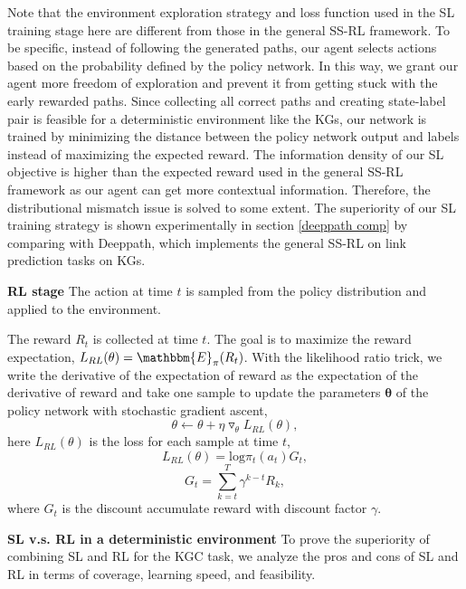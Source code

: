 \documentclass[lettersize,journal]{IEEEtran}
\begin{document}
Note that the environment exploration strategy and loss function used in the SL training stage here are different from those in the general SS-RL framework. To be specific, instead of following the generated paths, our agent selects actions based on the probability defined by the
policy network. In this way, we grant our agent more
freedom of exploration and prevent it from getting
stuck with the early rewarded paths. Since collecting all correct paths and creating state-label pair is feasible for a deterministic environment like the KGs, our network is trained by minimizing
the distance between the policy network output and labels
instead of maximizing the expected reward. The information density
of our SL objective is higher than the expected reward used in the general SS-RL framework as our agent can get more
contextual information. Therefore, the distributional mismatch
issue is solved to some extent. The superiority of our SL training strategy is shown experimentally in section \ref{deeppath comp} by comparing with Deeppath, which implements the general SS-RL on link prediction tasks on KGs.


\textbf{RL stage} The action at time $t$ is sampled from the policy distribution and applied to the environment. 

The reward $R_t$ is collected at time $t$. The goal is to maximize the reward expectation, $L_{RL}(\theta)=\mathbbm{E}_{\pi}(R_t)$.
With the likelihood ratio trick, we write the derivative of the expectation of reward as the expectation of the derivative of reward and take one sample to update the parameters $\mathbf{\theta}$ of the policy network with stochastic gradient ascent,
\begin{equation}
    \theta \leftarrow  \theta     + \eta \triangledown_{\theta} L_{RL}(\theta),
\end{equation}
here $L_{RL}(\theta)$ is the loss for each sample at time $t$,
\begin{equation}
    L_{RL}(\theta)= \mathrm{log}\pi_{t}(a_t)G_t,
\end{equation}
\begin{equation}
    G_t=\sum_{k=t}^{T}\gamma ^{k-t}R_k,
\end{equation}
where $G_t$ is the discount accumulate reward with discount factor $\gamma$.







\textbf{SL v.s. RL in a deterministic environment}
To prove the superiority of combining SL and RL for the KGC task, we analyze the pros and cons of SL and RL in terms of coverage, learning speed, and feasibility.
\end{document}
